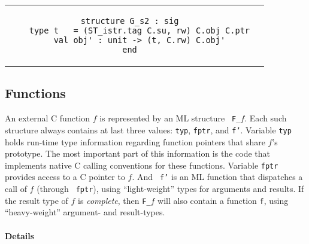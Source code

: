 \documentclass[titlepage,letterpaper]{article}
\begin{document}
\begin{small}
\begin{center}
\begin{tabular}{c|c}
\begin{minipage}{4in}
\begin{verbatim}
structure G_s2 : sig
    type t   = (ST_istr.tag C.su, rw) C.obj C.ptr
    val obj' : unit -> (t, C.rw) C.obj'
end

\end{verbatim}
\end{minipage}
\end{tabular}
\end{center}
\end{small}

\subsection{Functions}

An external C function $f$ is represented by an ML structure {\tt
  F\_}$f$.  Each such structure always contains at last three values:
{\tt typ}, {\tt fptr}, and {\tt f'}.  Variable {\tt typ} holds
run-time type information regarding function pointers that share $f$'s
prototype.  The most important part of this information is the code
that implements native C calling conventions for these functions.
Variable {\tt fptr} provides access to a C pointer to $f$.  And {\tt
  f'} is an ML function that dispatches a call of $f$ (through {\tt
  fptr}), using ``light-weight'' types for arguments and results.  If
the result type of $f$ is {\em complete}, then {\tt F\_}$f$ will also
contain a function {\tt f}, using ``heavy-weight'' argument- and
result-types.

\paragraph*{Details}
\end{document}
